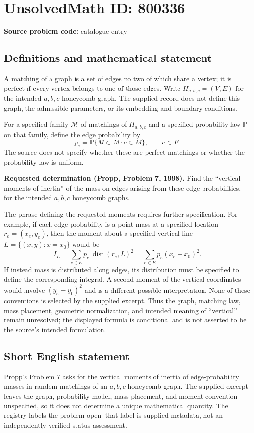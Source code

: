 \documentclass[11pt]{article}
\begin{document}
\section*{UnsolvedMath ID: 800336}
\textbf{Source problem code:} catalogue entry
\subsection{Definitions and mathematical statement}
A matching of a graph is a set of edges no two of which share a vertex; it is perfect if every vertex belongs to one of those edges. Write \(H_{a,b,c}=(V,E)\) for the intended \(a,b,c\) honeycomb graph. The supplied record does not define this graph, the admissible parameters, or its embedding and boundary conditions.

For a specified family \(\mathcal{M}\) of matchings of \(H_{a,b,c}\) and a specified probability law \(\mathbb{P}\) on that family, define the edge probability by
\[
p_e=\mathbb{P}\{M\in\mathcal{M}:e\in M\},\qquad e\in E.
\]
The source does not specify whether these are perfect matchings or whether the probability law is uniform.

\textbf{Requested determination (Propp, Problem 7, 1998).} Find the ``vertical moments of inertia'' of the mass on edges arising from these edge probabilities, for the intended \(a,b,c\) honeycomb graphs.

The phrase defining the requested moments requires further specification. For example, if each edge probability is a point mass at a specified location \(r_e=(x_e,y_e)\), then the moment about a specified vertical line \(L=\{(x,y):x=x_0\}\) would be
\[
I_L=\sum_{e\in E}p_e\,\operatorname{dist}(r_e,L)^2
=\sum_{e\in E}p_e(x_e-x_0)^2.
\]
If instead mass is distributed along edges, its distribution must be specified to define the corresponding integral. A second moment of the vertical coordinates would involve \((y_e-y_0)^2\) and is a different possible interpretation. None of these conventions is selected by the supplied excerpt. Thus the graph, matching law, mass placement, geometric normalization, and intended meaning of ``vertical'' remain unresolved; the displayed formula is conditional and is not asserted to be the source's intended formulation.
\subsection{Short English statement}
Propp's Problem 7 asks for the vertical moments of inertia of edge-probability masses in random matchings of an \(a,b,c\) honeycomb graph. The supplied excerpt leaves the graph, probability model, mass placement, and moment convention unspecified, so it does not determine a unique mathematical quantity. The registry labels the problem open; that label is supplied metadata, not an independently verified status assessment.
\end{document}
